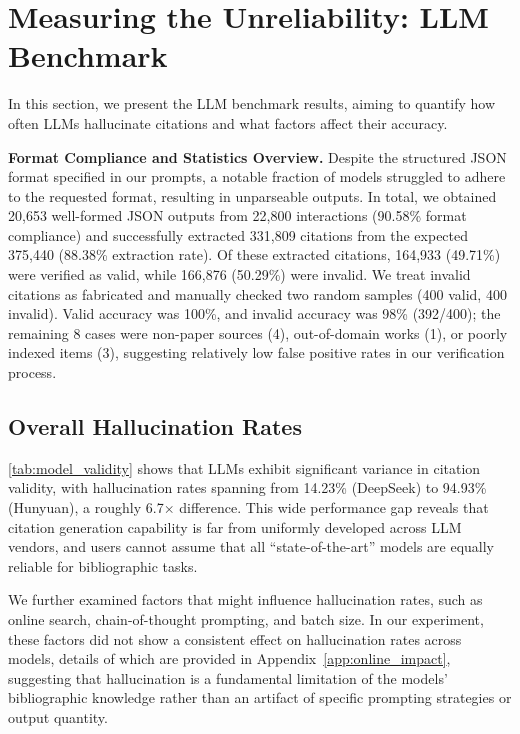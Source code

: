 \section{Measuring the Unreliability: LLM Benchmark}
\label{sec:llm_results}

In this section, we present the LLM benchmark results, aiming to quantify how often LLMs hallucinate citations and what factors affect their accuracy.

% 

\noindent
\textbf{Format Compliance and Statistics Overview.}
Despite the structured JSON format specified in our prompts, a notable fraction of models struggled to adhere to the requested format, resulting in
unparseable outputs.
In total, we obtained 20,653 well-formed JSON outputs from 22,800 interactions (90.58\% format compliance) and successfully extracted 331,809 citations from the expected 375,440 (88.38\% extraction rate).
Of these extracted citations, 164,933 (49.71\%) were verified as valid, while 166,876 (50.29\%) were invalid.
We treat invalid citations as fabricated and manually checked two random samples (400 valid, 400 invalid). Valid accuracy was 100\%, and invalid accuracy was 98\% (392/400); the remaining 8 cases were non-paper sources (4), out-of-domain works (1), or poorly indexed items (3), suggesting relatively low false positive rates in our verification process.



\subsection{Overall Hallucination Rates}

\cref{tab:model_validity} shows that LLMs exhibit significant variance in citation validity, with hallucination rates spanning from 14.23\% (DeepSeek) to 94.93\% (Hunyuan), a roughly 6.7$\times$ difference.
This wide performance gap reveals that citation generation capability is far from uniformly developed across LLM vendors, and users cannot assume that all ``state-of-the-art'' models are equally reliable for bibliographic tasks.

We further examined factors that might influence hallucination rates, such as online search, chain-of-thought prompting, and batch size.
In our experiment, these factors did not show a consistent effect on hallucination rates across models, details of which are provided in Appendix~\ref{app:online_impact}, suggesting that hallucination is a fundamental limitation of the models' bibliographic knowledge rather than an artifact of specific prompting strategies or output quantity.

